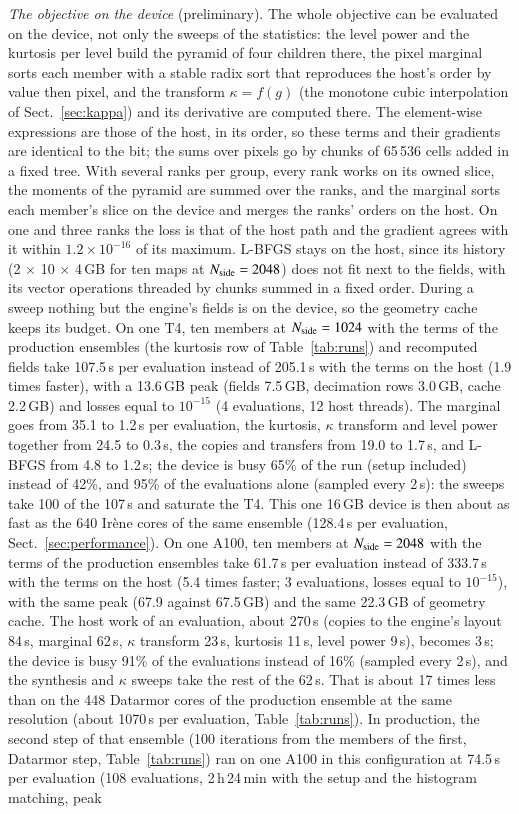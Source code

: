 \documentclass{aa}
\newcommand{\nside}{N_{\rm side}}
\begin{document}
\emph{The objective on the device} (preliminary). The whole objective can be evaluated on the device, not only the sweeps of the statistics: the level power and the kurtosis per level build the pyramid of four children there, the pixel marginal sorts each member with a stable radix sort that reproduces the host's order by value then pixel, and the transform $\kappa=f(g)$ (the monotone cubic interpolation of Sect.~\ref{sec:kappa}) and its derivative are computed there. The element-wise expressions are those of the host, in its order, so these terms and their gradients are identical to the bit; the sums over pixels go by chunks of 65\,536 cells added in a fixed tree. With several ranks per group, every rank works on its owned slice, the moments of the pyramid are summed over the ranks, and the marginal sorts each member's slice on the device and merges the ranks' orders on the host. On one and three ranks the loss is that of the host path and the gradient agrees with it within $1.2\times10^{-16}$ of its maximum. L-BFGS stays on the host, since its history (2 $\times$ 10 $\times$ 4\,GB for ten maps at $\nside=2048$) does not fit next to the fields, with its vector operations threaded by chunks summed in a fixed order. During a sweep nothing but the engine's fields is on the device, so the geometry cache keeps its budget. On one T4, ten members at $\nside=1024$ with the terms of the production ensembles (the kurtosis row of Table~\ref{tab:runs}) and recomputed fields take 107.5\,s per evaluation instead of 205.1\,s with the terms on the host (1.9 times faster), with a 13.6\,GB peak (fields 7.5\,GB, decimation rows 3.0\,GB, cache 2.2\,GB) and losses equal to $10^{-15}$ (4 evaluations, 12 host threads). The marginal goes from 35.1 to 1.2\,s per evaluation, the kurtosis, $\kappa$ transform and level power together from 24.5 to 0.3\,s, the copies and transfers from 19.0 to 1.7\,s, and L-BFGS from 4.8 to 1.2\,s; the device is busy 65\% of the run (setup included) instead of 42\%, and 95\% of the evaluations alone (sampled every 2\,s): the sweeps take 100 of the 107\,s and saturate the T4. This one 16\,GB device is then about as fast as the 640 Ir\`ene cores of the same ensemble (128.4\,s per evaluation, Sect.~\ref{sec:performance}). On one A100, ten members at $\nside=2048$ with the terms of the production ensembles take 61.7\,s per evaluation instead of 333.7\,s with the terms on the host (5.4 times faster; 3 evaluations, losses equal to $10^{-15}$), with the same peak (67.9 against 67.5\,GB) and the same 22.3\,GB of geometry cache. The host work of an evaluation, about 270\,s (copies to the engine's layout 84\,s, marginal 62\,s, $\kappa$ transform 23\,s, kurtosis 11\,s, level power 9\,s), becomes 3\,s; the device is busy 91\% of the evaluations instead of 16\% (sampled every 2\,s), and the synthesis and $\kappa$ sweeps take the rest of the 62\,s. That is about 17 times less than on the 448 Datarmor cores of the production ensemble at the same resolution (about 1070\,s per evaluation, Table~\ref{tab:runs}). In production, the second step of that ensemble (100 iterations from the members of the first, Datarmor step, Table~\ref{tab:runs}) ran on one A100 in this configuration at 74.5\,s per evaluation (108 evaluations, 2\,h\,24\,min with the setup and the histogram matching, peak 
\end{document}
